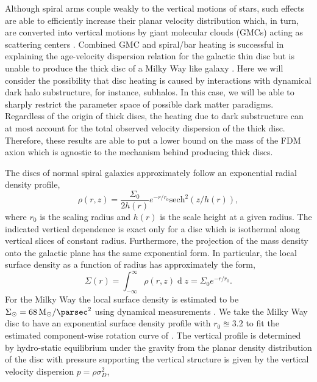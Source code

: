 \documentclass[usenatbib]{mnras}
\renewcommand{\d}[1]{\! \mathrm{d}#1 \:}
\renewcommand{\d}[1]{\ensuremath{\operatorname{d}\!{#1}}}
\begin{document}
Although spiral arms couple weakly to the vertical motions of stars, such effects are able to efficiently increase their planar velocity distribution which, in turn, are converted into vertical motions by giant molecular clouds (GMCs) acting as scattering centers \citep{vertical_structure_and_GMC}. Combined GMC and spiral/bar heating is successful in explaining the age-velocity dispersion relation for the galactic thin disc but is unable to produce the thick disc of a Milky Way like galaxy \citep{heating_history}.
Here we will consider the possibility that disc heating is caused by interactions with dynamical dark halo substructure, for instance, subhalos. In this case, we will be able to sharply restrict the parameter space of possible dark matter paradigms. Regardless of the origin of thick discs, the heating due to dark substructure can at most account for the total observed velocity dispersion of the thick disc. Therefore, these results are able to put a lower bound on the mass of the FDM axion which is agnostic to the mechanism behind producing thick discs.
\par
The discs of normal spiral galaxies approximately follow an exponential radial density profile,
\begin{equation}
\rho(r, z) = \frac{\Sigma_0}{2 h(r)} e^{-r/r_0} \mathrm{sech}^2{(z/h(r))}, 
\end{equation}
where $r_0$ is the scaling radius and $h(r)$ is the scale height at a given radius. The indicated vertical dependence is exact only for a disc which is isothermal along vertical slices of constant radius. Furthermore, the projection of the mass density onto the galactic plane has the same exponential form. In particular, the local surface density as a function of radius has approximately the form,
\begin{equation}
\Sigma(r) = \int_{-\infty}^{\infty} \rho(r, z) \d{z} = \Sigma_0 e^{-r / r_0}.
\end{equation}
For the Milky Way the local surface density is estimated to be $\Sigma_{\odot} = \SI{68}{M_{\odot} \per \parsec \squared}$ using dynamical measurements \citep{dynamical_measurement}. We take the Milky Way disc to have an exponential surface density profile with $r_0 \approxeq 3.2$ to fit the estimated component-wise rotation curve of \cite{milky_way_halo}. The vertical profile is determined by hydro-static equilibrium under the gravity from the planar density distribution of the disc with pressure supporting the vertical structure is given by the vertical velocity dispersion $p = \rho \sigma_D^2$,
\end{document}
